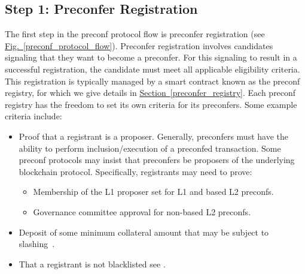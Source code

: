 \documentclass[a4paper]{article}
\theoremstyle{boldstyle}
\begin{document}
\subsection{Step 1: Preconfer Registration} 
\label{step1:preconfer_registration}
    The first step in the preconf protocol flow is preconfer registration (see \hyperref[preconf_protocol_flow]{Fig.~\ref{preconf_protocol_flow}}). Preconfer registration involves candidates signaling that they want to become a preconfer. For this signaling to result in a successful registration, the candidate must meet all applicable eligibility criteria.
    This registration is typically managed by a smart contract known as the preconf registry, for which we give details in \hyperref[preconfer_registry]{Section~\ref{preconfer_registry}}.
    Each preconf registry has the freedom to set its own criteria for its preconfers. Some example criteria include:
    \begin{itemize}
        \item Proof that a registrant is a proposer. Generally, preconfers must have the ability to perform inclusion/execution of a preconfed transaction. Some preconf protocols may insist that preconfers be proposers of the underlying blockchain protocol. Specifically, registrants may need to prove:
        \begin{itemize}
            \item Membership of the L1 proposer set for L1 and based L2 preconfs.
            \item Governance committee approval for non-based L2 preconfs.
        \end{itemize}
        \item Deposit of some minimum collateral amount that may be subject to slashing~\cite{W:CrediblyNeutralPreconfirmationCollateral:ThePreconfirmationRegistry, W:PreconfirmationRegistry}.
        \item That a registrant is not blacklisted see \cite{W:PreconfirmationFairExchange}.     
    \end{itemize}
\end{document}
